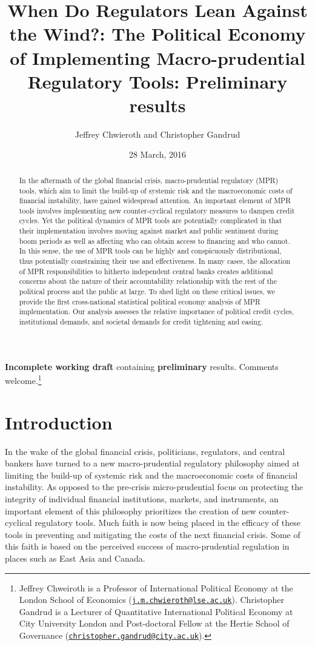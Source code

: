 \documentclass[]{article}
\title{When Do Regulators Lean Against the Wind?: The Political Economy of
Implementing Macro-prudential Regulatory Tools: Preliminary results}
\author{Jeffrey Chwieroth and Christopher Gandrud}
\date{28 March, 2016}
\let\rmarkdownfootnote\footnote%
\def\footnote{\protect\rmarkdownfootnote}
\begin{document}
\maketitle

\textbf{Incomplete working draft} containing \textbf{preliminary}
results. Comments welcome.\footnote{Jeffrey Chweiroth is a Professor of
  International Political Economy at the London School of Economics
  (\href{mailto:j.m.chwieroth@lse.ac.uk}{\nolinkurl{j.m.chwieroth@lse.ac.uk}}).
  Christopher Gandrud is a Lecturer of Quantitative International
  Political Economy at City University London and Post-doctoral Fellow
  at the Hertie School of Governance
  (\href{mailto:christopher.gandrud@city.ac.uk}{\nolinkurl{christopher.gandrud@city.ac.uk}}).}

\begin{abstract}
In the aftermath of the global financial crisis, macro-prudential regulatory (MPR) tools, which aim to limit the build-up of systemic risk and the macroeconomic costs of financial instability, have gained widespread attention. An important element of MPR tools involves implementing new counter-cyclical regulatory measures to dampen credit cycles. Yet the political dynamics of MPR tools are potentially complicated in that their implementation involves moving against market and public sentiment during boom periods as well as affecting who can obtain access to financing and who cannot. In this sense, the use of MPR tools can be highly and conspicuously distributional, thus potentially constraining their use and effectiveness. In many cases, the allocation of MPR responsibilities to hitherto independent central banks creates additional concerns about the nature of their accountability relationship with the rest of the political process and the public at large. To shed light on these critical issues, we provide the first cross-national statistical political economy analysis of MPR implementation. Our analysis assesses the relative importance of political credit cycles, institutional demands, and societal demands for credit tightening and easing.
\end{abstract}

\clearpage

\section{Introduction}\label{introduction}

In the wake of the global financial crisis, politicians, regulators, and
central bankers have turned to a new macro-prudential regulatory
philosophy aimed at limiting the build-up of systemic risk and the
macroeconomic costs of financial instability. As opposed to the
pre-crisis micro-prudential focus on protecting the integrity of
individual financial institutions, markets, and instruments, an
important element of this philosophy prioritizes the creation of new
counter-cyclical regulatory tools. Much faith is now being placed in the
efficacy of these tools in preventing and mitigating the costs of the
next financial crisis. Some of this faith is based on the perceived
success of macro-prudential regulation in places such as East Asia and
Canada.
\end{document}
